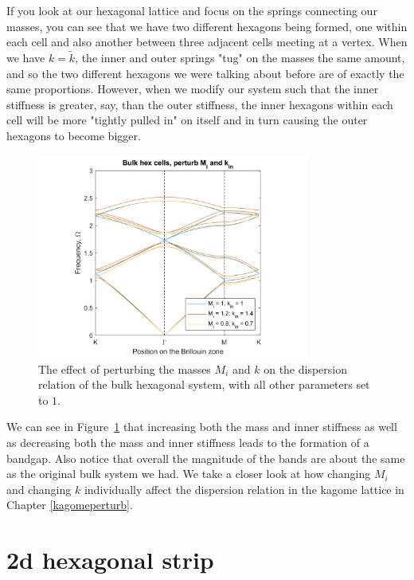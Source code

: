 If you look at our hexagonal lattice and focus on the springs connecting our
masses, you can see that we have two different hexagons being formed, one
within each cell and also another between three adjacent cells meeting at a
vertex. When we have $k=\tilde{k}$, the inner and outer springs "tug" on the
masses the same amount, and so the two different hexagons we were talking about
before are of exactly the same proportions. However, when we modify our system
such that the inner stiffness is greater, say, than the outer stiffness, the
inner hexagons within each cell will be more "tightly pulled in" on itself and
in turn causing the outer hexagons to become bigger.

\begin{figure}[!h]
\centering
\includegraphics[width=0.8\textwidth]{imgs/hexperturb2.png}
\caption{\label{fig:hex2} The effect of perturbing the masses $M_i$ and
  $k$ on the dispersion relation of the bulk hexagonal system, with all other
  parameters set to $1$.}
\end{figure}

We can see in Figure~\ref{fig:hex2} that increasing both the mass and inner
stiffness as well as decreasing both the mass and inner stiffness leads to the
formation of a bandgap. Also notice that overall the magnitude of the bands are
about the same as the original bulk system we had. We take a closer look at how
changing $M_i$ and changing $k$ individually affect the dispersion relation in
the kagome lattice in Chapter \ref{kagomeperturb}.

\section{2d hexagonal strip}
\label{formstrip}

